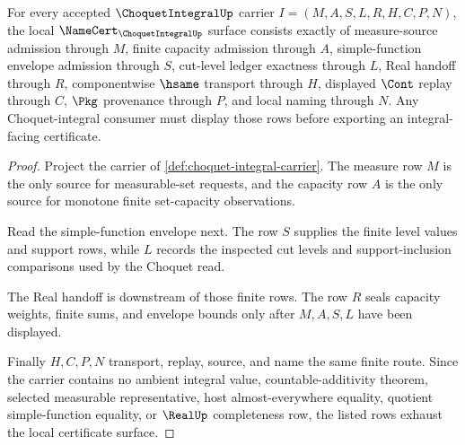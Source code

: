 \begin{theorem}
\label{thm:choquet-integral-namecert-obligations}
For every accepted $\ChoquetIntegralUp$ carrier $I=(M,A,S,L,R,H,C,P,N)$, the local $\NameCert_{\ChoquetIntegralUp}$ surface consists exactly of measure-source admission through $M$, finite capacity admission through $A$, simple-function envelope admission through $S$, cut-level ledger exactness through $L$, Real handoff through $R$, componentwise $\hsame$ transport through $H$, displayed $\Cont$ replay through $C$, $\Pkg$ provenance through $P$, and local naming through $N$. Any Choquet-integral consumer must display those rows before exporting an integral-facing certificate.
\end{theorem}
\begin{proof}
Project the carrier of \autoref{def:choquet-integral-carrier}. The measure row $M$ is the only source for measurable-set requests, and the capacity row $A$ is the only source for monotone finite set-capacity observations.

Read the simple-function envelope next. The row $S$ supplies the finite level values and support rows, while $L$ records the inspected cut levels and support-inclusion comparisons used by the Choquet read.

The Real handoff is downstream of those finite rows. The row $R$ seals capacity weights, finite sums, and envelope bounds only after $M,A,S,L$ have been displayed.

Finally $H,C,P,N$ transport, replay, source, and name the same finite route. Since the carrier contains no ambient integral value, countable-additivity theorem, selected measurable representative, host almost-everywhere equality, quotient simple-function equality, or $\RealUp$ completeness row, the listed rows exhaust the local certificate surface.
\end{proof}

